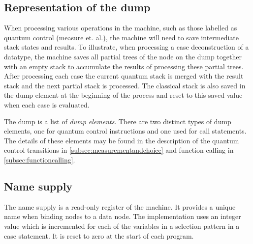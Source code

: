 \subsection{Representation of the dump}\label{sec:representationofdump}
When processing various operations in the machine, such as  those
labelled as quantum control (measure et. al.), the machine will 
need to save intermediate stack states and results. To illustrate, when 
processing a case deconstruction of a datatype,
the machine saves all partial trees of the node on the dump together
with an empty stack to accumulate
 the results of processing these partial trees.
After processing  each case the current quantum stack is
merged with the result stack and the next partial stack is processed. 
The classical stack is also saved in the
dump element at
the beginning of the process and reset to this saved value 
when each case is evaluated.


The dump is  a list of \emph{dump elements}. There are two distinct types
of dump elements, one for quantum control instructions and one used for
  call statements. The details of these elements may
be found in the description of the quantum control transitions in
 \vref{subsec:measurementandchoice} and 
function calling in \vref{subsec:functioncalling}.

\subsection{Name supply}
The name supply is a read-only register of the machine. It 
provides a unique name
when binding nodes to a data node. The implementation 
uses an integer value which
is incremented for each of the variables in a selection pattern in
a case statement. It is reset to zero at
the start of each program.
